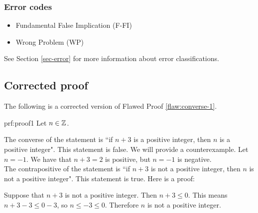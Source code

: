 \subsubsection{Error codes}
\begin{itemize}
	\item 	Fundamental False Implication (F-FI)
	\item Wrong Problem (WP)
\end{itemize}
See Section \ref{sec-error} for more information about error classifications.

\clearpage
\subsection{Corrected proof}

The following is a corrected version of Flawed Proof \ref{flaw:converse-1}. 

\begin{prf}{prf:proof1} 
Let $n\in \mathbb Z$.

The converse of the statement is ``if $n+3$ is a positive integer, then $n$ is a positive integer". This statement is false. We will provide a counterexample. Let $n = -1$. We have that $n+3 = 2$ is positive, but $n = -1$ is negative.\\

The contrapositive of the statement is ``if $n+3$ is not a positive integer, then $n$ is not a positive integer". This statement is true. Here is a proof:

Suppose that $n+3$ is not a positive integer. Then $n+3 \leq 0$. This means $n+3 - 3 \leq 0 - 3$, so $n \leq -3 \leq  0$. Therefore $n$ is not a positive integer. 
\end{prf}